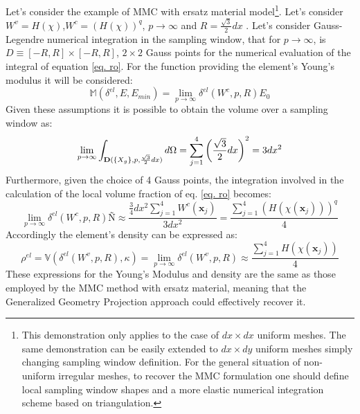  Let's consider the example of MMC with ersatz material model\footnote{This demonstration only applies to the case of $dx \times dx$ uniform meshes. The same demonstration can be easily extended to $dx \times dy$ uniform meshes simply changing sampling window definition. For the general situation of non-uniform irregular meshes, to recover the MMC formulation one should define local sampling window shapes and a more elastic numerical integration scheme based on triangulation.}.
 Let's consider $W^v=H(\chi)$,$W^c=(H(\chi))^q$, $p\to\infty$ and $R=\frac{\sqrt{3}}{2}dx$ . Let's consider Gauss-Legendre numerical integration in the sampling window, that for $p\to \infty$, is $D \equiv [-R,R]\times [-R,R]$,  $2 \times 2$ Gauss points for the numerical evaluation of the integral of equation \eqref{eq. ro}. For the function providing the element's Young's modulus it will be considered:
 \begin{equation}
   \mathbb{M}(\delta^{el},E,E_{min})=\lim_{p\to \infty}\delta^{el}(W^c,p,R)E_0 
 \end{equation}
 Given these assumptions it is possible to obtain the volume over a sampling window as: 
 \begin{equation}
    \lim_{p\to \infty} \int_{\mathbf{D}(\left\{{X_g}\right\},p,\frac{\sqrt{3}}{2}dx)}{d\Omega}=\sum_{j=1}^4 \left(\frac{\sqrt{3}}{2}dx\right)^2=3 dx^2
 \end{equation}
 Furthermore, given the choice of 4 Gauss points, the integration involved in the calculation of the local volume fraction of eq. \eqref{eq. ro} becomes:
 \begin{equation}
     \lim_{p\to \infty}\delta^{el}(W^c,p,R)Ñ
    \approx \frac{\frac{3}{4}dx^2\sum_{j=1}^4W^c(\mathbf{x}_j)}{3dx^2}=\frac{\sum_{j=1}^4(H(\chi(\mathbf{x}_j)))^q}{4}
  \end{equation}
 Accordingly the element's density can be expressed as:
 \begin{equation}
     \rho^{el}=\mathbb{V}(\delta^{el}(W^v,p,R),\kappa)=\lim_{p\to \infty}\delta^{el}(W^v,p,R)\approx\frac{\sum_{j=1}^4H(\chi(\mathbf{x}_j))}{4}
 \end{equation}
 These expressions for the Young's Modulus and density are the same as those employed by the MMC method with ersatz material, meaning that the Generalized Geometry Projection approach could effectively recover it. 
 
